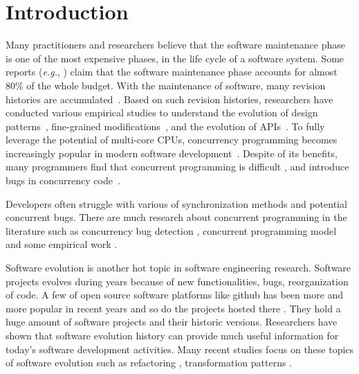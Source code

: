 \documentclass[conference]{IEEEtran}
\begin{document}
\section{Introduction}
Many practitioners and researchers believe that the software maintenance phase is one of the most expensive phases, in the life cycle of a software system. Some reports (\emph{e.g.}, \cite{ahn2003software}) claim that the software maintenance phase accounts for almost 80\% of the whole budget. With the maintenance of software, many revision histories are accumulated~\cite{conf/icsm/Borges16}. Based on such revision histories, researchers have conducted various empirical studies to understand the evolution of design patterns~\cite{aversano2007empirical}, fine-grained modifications~\cite{german2006empirical}, and the evolution of APIs~\cite{mcdonnell2013empirical}. To fully leverage the potential of multi-core CPUs, concurrency programming becomes increasingly popular in modern software development~\cite{journals/jss/PintoTFFB15}. Despite of its benefits, many programmers find that concurrent programming is difficult \cite{journals/corr/McKenney17}, and introduce bugs in concurrency code~\cite{conf/asplos/LuPSZ08}. 


Developers often struggle with various of synchronization methods and potential concurrent bugs. There are much research about concurrent programming in the literature such as concurrency bug detection \cite{conf/pldi/FlanaganF09, conf/kbse/KroeningPSW16, conf/pldi/FlanaganFY08}, concurrent programming model \cite{conf/java/Lea00, conf/oopsla/Bagherzadeh15} and some empirical work \cite{conf/sosp/DavidGT13, conf/oopsla/PintoTC15}.

Software evolution is another hot topic in software engineering research. Software projects evolves during years because of new functionalities, bugs, reorganization of code. A few of open source software platforms like github has been more and more popular in recent years and so do the projects hosted there \cite{conf/icsm/Borges16, conf/icsm/BorgesHV16}. They hold a huge amount of software projects and their historic versions. Researchers have shown that software evolution history can provide much useful information for today's software development activities. Many recent studies focus on these topics of software evolution such as refactoring \cite{conf/icse/KimBDA16, conf/icsm/WahlerDS16}, transformation patterns \cite{conf/wcre/JiangPWXZ15, conf/icse/MengKM13}.
\end{document}
